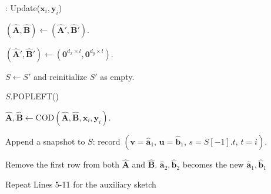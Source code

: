 
\begin{algorithm}[t]
    \caption{\oursolution: Update(\(\boldsymbol{x}_i,\boldsymbol{y}_i\))}
    \label{alg:simple-update}
    \DontPrintSemicolon
    
    {        
        \((\hat{\boldsymbol{A}}, \hat{\boldsymbol{B}}) \leftarrow (\hat{\boldsymbol{A}}', \hat{\boldsymbol{B}}')\).
    
        \((\hat{\boldsymbol{A}}', \hat{\boldsymbol{B}}') \leftarrow (\boldsymbol{0}^{d_x\times l}, \boldsymbol{0}^{d_y\times l})\).

        \(S \leftarrow S'\) and reinitialize \(S'\) as empty.
    }
    
    {
        \(S\).POPLEFT() 
    }
    
    \(\hat{\boldsymbol{A}},\hat{\boldsymbol{B}} \leftarrow \text{COD}(\hat{\boldsymbol{A}},\hat{\boldsymbol{B}},\boldsymbol{x}_i,\boldsymbol{y}_i)\).\;
    {
        Append a snapshot to \(S\): record
        \(
        (\boldsymbol{v}=\hat{\boldsymbol{a}}_1,\, \boldsymbol{u}=\hat{\boldsymbol{b}}_1,\, s=S[-1].t,\, t=i).
        \)
        
        Remove the first row from both \(\hat{\boldsymbol{A}}\) and \(\hat{\boldsymbol{B}}\).\;
        $\hat{\boldsymbol{a}}_2, \hat{\boldsymbol{b}}_2$ becomes the new $\hat{\boldsymbol{a}}_1, \hat{\boldsymbol{b}}_1$
    }
    
    Repeat Lines 5-11 for the auxiliary sketch\;
\end{algorithm}

